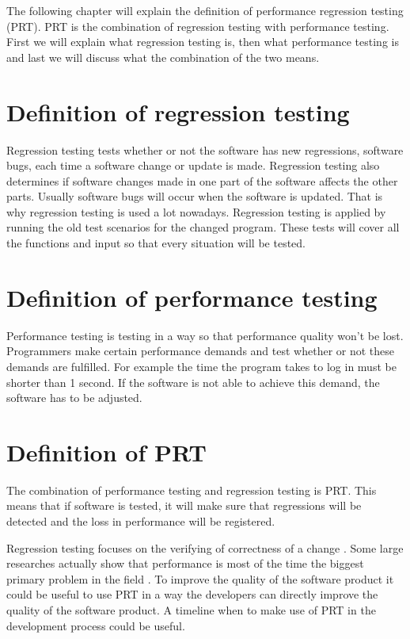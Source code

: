 The following chapter will explain the definition of performance regression testing (PRT). PRT is the combination of regression testing with performance testing. First we will explain what regression testing is, then what performance testing is and last we will discuss what the combination of the two means.

\section{Definition of regression testing}
Regression testing tests whether or not the software has new regressions, software bugs, each time a software change or update is made. Regression testing also determines if software changes made in one part of the software affects the other parts. Usually software bugs will occur when the software is updated. That is why regression testing is used a lot nowadays. Regression testing is applied by running the old test scenarios for the changed program. These tests will cover all the functions and input so that every situation will be tested.

\section{Definition of performance testing}
Performance testing is testing in a way so that performance quality won't be lost. Programmers make certain performance demands and test whether or not these demands are fulfilled. For example the time the program takes to log in must be shorter than 1 second. If the software is not able to achieve this demand, the software has to be adjusted.

\section{Definition of PRT}
The combination of performance testing and regression testing is PRT. This means that if software is tested, it will make sure that regressions will be detected and the loss in performance will be registered.

Regression testing focuses on the verifying of correctness of a change \cite{detection_performance_regressions}. Some large researches actually show that performance is most of the time the biggest primary problem in the field \cite{Mining_PRT_Automated}. \newline To improve the quality of the software product it could be useful to use PRT in a way the developers can directly improve the quality of the software product. A timeline when to make use of PRT in the development process could be useful.
